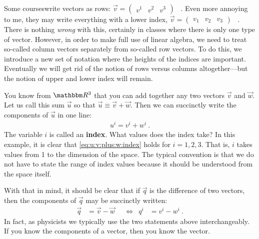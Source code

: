 \documentclass[12pt, oneside]{report}    %
\begin{document}
\begin{example}
Some courses\sidenotemark write vectors as rows: $\vec{v}=\begin{pmatrix}
    v^1 & v^2 & v^3
\end{pmatrix}$ \ . Even more annoying to me, they may write everything with a lower index, $\vec{v}=\begin{pmatrix}
    v_1 & v_2 & v_3
\end{pmatrix}$ \ . There is nothing \emph{wrong} with this, certainly in classes where there is only one type of vector. However, in order to make full use of linear algebra, we need to treat so-called column vectors separately from so-called row vectors. To do this, we introduce a new set of notation where the heights of the indices are important. Eventually we will get rid of the notion of rows versus columns altogether---but the notion of upper and lower index will remain.
\end{example}


You know from $\RR ^3$ that you can add together any two vectors $\vec{v}$ and $\vec{w}$.
% 
Let us call this sum $\vec{u}$ so that $\vec{u}\equiv \vec{v}+\vec{w}$. Then we can succinctly write the components of $\vec{u}$ in one line:
\begin{align}
    u^i = v^i + w^i \ .
    \label{eq:u:v:plus:w:index}
\end{align}
The variable $i$ is called an \textbf{index}. What values does the index take? In this example, it is 
clear that \eqref{eq:u:v:plus:w:index} holds for $i=1,2,3$. That is, $i$ takes values from 1 to the dimension of the space. The typical convention is that we do not have to state the range of index values because it should be understood from the space itself. 

With that in mind, it should be clear that if $\vec{q}$ is the difference of two vectors, then the components of $\vec{q}$ may be succinctly written:
\begin{align}
\vec{q} &= \vec{v}-\vec{w}    
&
&\Leftrightarrow
&
q^i &= v^i - w^i \ .
\end{align}
In fact, as physicists we typically use the two statements above interchangeably. If you know the components of a vector, then you know the vector.
\end{document}
